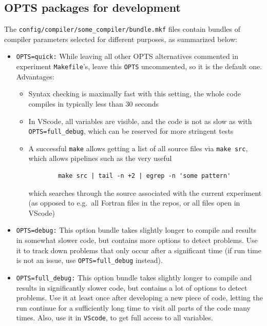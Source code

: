 \documentclass[paper=a4,fontsize=11pt]{scrartcl}
\numberwithin{equation}{section}		%
\numberwithin{figure}{section}			%
\numberwithin{table}{section}				%
\newcommand{\codecolor}{\color{Blue}}
\newcommand{\cmdcolor}{\color{ForestGreen}}
\newcommand{\filecolor}{\color{NavyBlue}}
\newcommand{\File}[1]{{\filecolor\texttt{#1}}}
\newcommand{\Code}[1]{{\codecolor\texttt{#1}}}
\newcommand{\Cmd}[1]{{\cmdcolor\texttt{#1}}}
\begin{document}
\subsection{OPTS packages for development}
The \File{config/compiler/some\_compiler/bundle.mkf} files contain bundles of compiler parameters selected for different purposes, as summarized below:

\begin{itemize}
\item \Code{OPTS=quick:} While leaving all other OPTS alternatives commented in experiment \File{Makefile}'s, leave this \verb'OPTS' uncommented, so it is the default one.  Advantages:
\begin{itemize}
    \item Syntax checking is maximally fast with this setting, the whole code compiles in typically less than 30 seconds
    \item In VScode, all variables are visible, and the code is not as slow as with \Code{OPTS=full\_debug}, which can be reserved for more stringent tests
    \item A successful \Cmd{make} allows getting a list of all source files via \Cmd{make src}, which allows pipelines such as the very useful
    \begin{verbatim}
        make src | tail -n +2 | egrep -n 'some pattern'
    \end{verbatim}
    which searches through the source associated with the current experiment (as opposed to e.g.\ all Fortran files in the repos, or all files open in VScode)
\end{itemize}

\item \Code{OPTS=debug:}
This option bundle takes slightly longer to compile and results in somewhat slower code, but contains more options to detect problems.  Use it to track down problems that only occur after a significant time (if run time is not an issue, use \Code{OPTS=full\_debug} instead).

\item \Code{OPTS=full\_debug:}
This option bundle takes slightly longer to compile and results in significantly slower code, but contains a lot of options to detect problems.  Use it at least once after developing a new  piece of code, letting the run continue for a sufficiently long time to visit all parts of the code many times.  Also, use it in \verb'VScode', to get full access to all variables.


\end{itemize}
\end{document}
